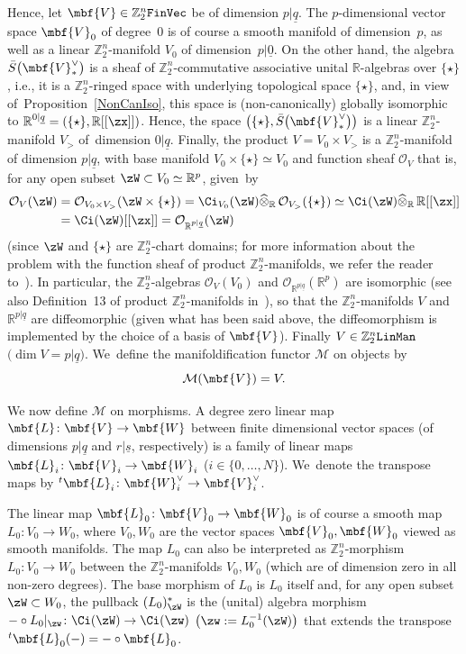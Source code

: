 \documentclass[10pt,a4paper]{amsart}
\newcommand{\op}[1]{\operatorname{#1}}
\newcommand{\R}{{\mathbb R}}
\newcommand{\Z}{{\mathbb Z}}
\def\ul{\underline}
\def\cM{\cal M}
\def\cO{\mathcal{O}}
\def\cM{\mathcal{M}}
\def\ul{\underline}
\newcommand{\0}{\otimes}
\numberwithin{equation}{section}
\providecommand{\cal}{\mathcal}
\begin{document}
Hence, let $\mbf{V}\in\Z_2^n\tt FinVec$ be of dimension $p|\ul q$. The $p$-dimensional vector space $\mbf{V}_0$ of degree~$0$ is of course a smooth manifold of dimension~$p$, as well as a linear $\Z_2^n$-manifold $V_0$ of dimension~$p|\ul 0$. On the other hand, the algebra $\bar{S}\big(\mbf{V}^\vee_*\big)$ is a sheaf of $\Z_2^n$-commutative associative unital $\R$-algebras over $\{\star\}$, i.e., it is a $\Z_2^n$-ringed space with underlying topological space $\{\star\}$, and, in view of~Proposition~\ref{NonCanIso}, this space is (non-canonically) globally isomorphic to $\R^{0|\ul q}=(\{\star\},\R[[\zx]])$. Hence, the space $\big(\{\star\},\bar{S}\big(\mbf{V}_*^\vee\big)\big)$ is a linear $\Z_2^n$-manifold $V_>$ of~dimension $0|\ul q$. Finally, the product $V=V_0\times V_>$ is a $\Z_2^n$-manifold of dimension $p|\ul q$, with base manifold $V_0\times\{\star\}\simeq V_0$ and function sheaf $\cO_{V}$ that is, for any open subset $\zW\subset V_0\simeq \R^p$, given~by
\begin{align}
\cO_V(\zW)&=\cO_{V_0\times V_>}(\zW\times\{\star\})= \Ci_{V_0}(\zW)\widehat{\0}_\R\,\cO_{V_>}(\{\star\})\simeq \Ci(\zW)\widehat{\0}_\R\,\R[[\zx]]\nonumber
\\
&= \Ci(\zW)[[\zx]]=\cO_{\R^{p|\ul q}}(\zW)\label{FunShV}
\end{align}
(since $\zW$ and $\{\star\}$ are $\Z_2^n$-chart domains; for more information about the problem with the function sheaf of product $\Z_2^n$-manifolds, we refer the reader to~\cite{Bruce:2019}). In particular, the $\Z_2^n$-algebras $\cO_V(V_0)$ and $\cO_{\R^{p|\ul q}}(\R^p)$ are isomorphic (see also Definition~13 of product $\Z_2^n$-manifolds in~\cite{Bruce:2019}), so that the $\Z_2^n$-manifolds $V$ and $\R^{p|\ul q}$ are diffeomorphic (given what has been said above, the diffeomorphism is implemented by the choice of a basis of $\mbf{V}$). Finally $V\in\Z_2^n\tt LinMan$ $\big(\op{dim} V=p|\ul q\big)$. We~define the manifoldification functor $\cM$ on objects by
\[%
\cM(\mbf{V})=V.
\]

We now define $\cM$ on morphisms. A degree zero linear map $\mbf{L}\colon \mbf{V}\to\mbf{W}$ between finite dimensional vector spaces (of dimensions $p|\ul q$ and $r|\ul s$, respectively) is a family of linear maps $\mbf{L}_i\colon \mbf{V}_i\to\mbf{W}_i$ ($i\in\{0,\dots, N\}$). We~denote the transpose maps by $^t\mbf{L}_i\colon \mbf{W}_i^\vee\to \mbf{V}_i^\vee$.

The linear map $\mbf{L}_0\colon \mbf{V}_0\to\mbf{W}_0$ is of course a smooth map $L_0\colon V_0\to W_0$, where $V_0,W_0$ are the vector spaces $\mbf{V}_0,\mbf{W}_0$ viewed as smooth manifolds. The map $L_0$ can also be interpreted as $\Z_2^n$-morphism $L_0\colon V_0\to W_0$ between the $\Z_2^n$-manifolds $V_0,W_0$ (which are of dimension zero in all non-zero degrees). The base morphism of $L_0$ is $L_0$ itself and, for any open subset $\zW\subset W_0$, the pullback $(L_0)^*_\zW$ is the (unital) algebra morphism $-\circ L_0|_\zw\colon \Ci(\zW)\to \Ci(\zw)$ $\big(\zw:=L_0^{-1}(\zW)\big)$ that extends the transpose $^t\mbf{L}_0(-)= -\circ \mbf{L}_0$.
\end{document}
